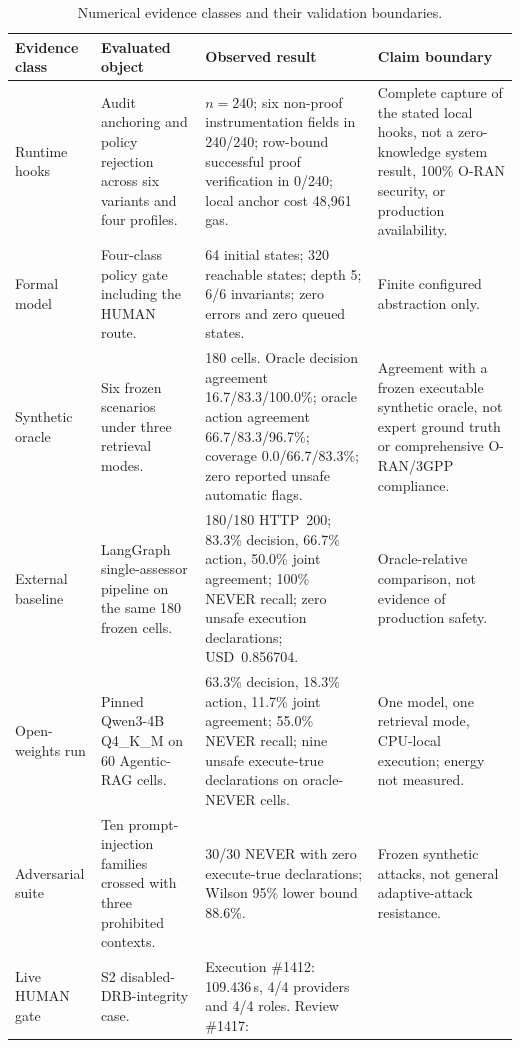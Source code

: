 \documentclass[journal]{IEEEtran}
\newif\ifshowrevisions
\begin{document}
\begin{table}[!t]
\ifshowrevisions\color{blue}\else\color{black}\fi
\centering
\caption{Numerical evidence classes and their validation boundaries.}
\label{tab:kpi-classes}
\begin{adjustbox}{max width=\textwidth}
\begin{tabular}{L{2.3cm}L{3.5cm}L{6.4cm}L{5.3cm}}
\toprule
Evidence class & Evaluated object & Observed result & Claim boundary \\
\midrule
Runtime hooks &
Audit anchoring and policy rejection across six variants and four profiles. &
$n=240$; six non-proof instrumentation fields in 240/240; row-bound successful
proof verification in 0/240; local anchor cost 48{,}961 gas. &
Complete capture of the stated local hooks, not a zero-knowledge system result,
100\% O-RAN security, or production availability. \\
Formal model &
Four-class policy gate including the HUMAN route. &
64 initial states; 320 reachable states; depth 5; 6/6 invariants; zero errors
and zero queued states. &
Finite configured abstraction only. \\
Synthetic oracle &
Six frozen scenarios under three retrieval modes. &
180 cells. Oracle decision agreement 16.7/83.3/100.0\%; oracle action agreement
66.7/83.3/96.7\%; coverage 0.0/66.7/83.3\%; zero reported unsafe automatic flags. &
Agreement with a frozen executable synthetic oracle, not expert ground truth
or comprehensive O-RAN/3GPP compliance. \\
External baseline &
LangGraph single-assessor pipeline on the same 180 frozen cells. &
180/180 HTTP~200; 83.3\% decision, 66.7\% action, 50.0\% joint agreement;
100\% NEVER recall; zero unsafe execution declarations; USD~0.856704. &
Oracle-relative comparison, not evidence of production safety. \\
Open-weights run &
Pinned Qwen3-4B Q4\_K\_M on 60 Agentic-RAG cells. &
63.3\% decision, 18.3\% action, 11.7\% joint agreement; 55.0\% NEVER recall;
nine unsafe execute-true declarations on oracle-NEVER cells. &
One model, one retrieval mode, CPU-local execution; energy not measured. \\
Adversarial suite &
Ten prompt-injection families crossed with three prohibited contexts. &
30/30 NEVER with zero execute-true declarations; Wilson 95\% lower bound 88.6\%. &
Frozen synthetic attacks, not general adaptive-attack resistance. \\
Live HUMAN gate &
S2 disabled-DRB-integrity case. &
Execution \#1412: 109.436\,s, 4/4 providers and 4/4 roles. Review \#1417:

\end{tabular}
\end{adjustbox}
\end{table}
\end{document}
